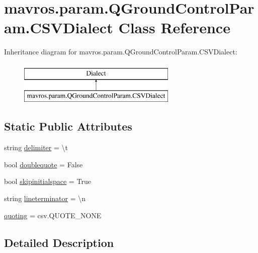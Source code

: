 \hypertarget{classmavros_1_1param_1_1QGroundControlParam_1_1CSVDialect}{}\section{mavros.\+param.\+Q\+Ground\+Control\+Param.\+C\+S\+V\+Dialect Class Reference}
\label{classmavros_1_1param_1_1QGroundControlParam_1_1CSVDialect}
Inheritance diagram for mavros.\+param.\+Q\+Ground\+Control\+Param.\+C\+S\+V\+Dialect\+:\begin{figure}[H]
\begin{center}
\leavevmode
\includegraphics[height=2.000000cm]{classmavros_1_1param_1_1QGroundControlParam_1_1CSVDialect}
\end{center}
\end{figure}
\subsection*{Static Public Attributes}
\begin{DoxyCompactItemize}
\item 
string \mbox{\hyperlink{classmavros_1_1param_1_1QGroundControlParam_1_1CSVDialect_a9f678c5ebb823cbe7cb2d8e8942ca52b}{delimiter}} = \textquotesingle{}\textbackslash{}t\textquotesingle{}
\item 
bool \mbox{\hyperlink{classmavros_1_1param_1_1QGroundControlParam_1_1CSVDialect_a9450535576f53e5e89119fba59a0f01d}{doublequote}} = False
\item 
bool \mbox{\hyperlink{classmavros_1_1param_1_1QGroundControlParam_1_1CSVDialect_a8019db67366707f27db4a9a5030ac24e}{skipinitialspace}} = True
\item 
string \mbox{\hyperlink{classmavros_1_1param_1_1QGroundControlParam_1_1CSVDialect_af97a34d502ea3aa9d1d59484c4b56b15}{lineterminator}} = \textquotesingle{}\textbackslash{}n\textquotesingle{}
\item 
\mbox{\hyperlink{classmavros_1_1param_1_1QGroundControlParam_1_1CSVDialect_a6e0edbfabd4b52544b05a1cba8383046}{quoting}} = csv.\+Q\+U\+O\+T\+E\+\_\+\+N\+O\+NE
\end{DoxyCompactItemize}


\subsection{Detailed Description}



